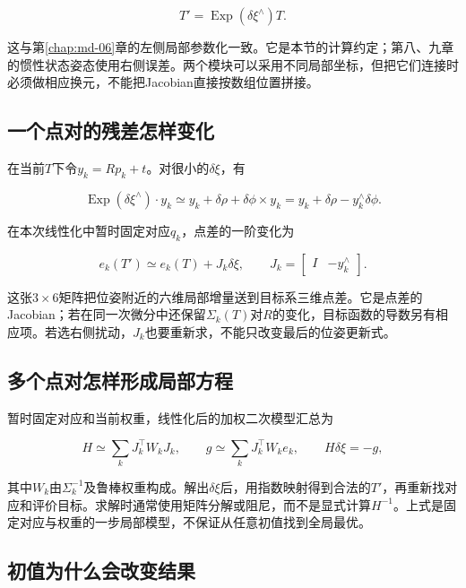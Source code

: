 \begin{equation*}
T'=\operatorname{Exp}(\delta\xi^\wedge)T.
\end{equation*}

这与第\ref{chap:md-06}章的左侧局部参数化一致。它是本节的计算约定；第八、九章的惯性状态姿态使用右侧误差。两个模块可以采用不同局部坐标，但把它们连接时必须做相应换元，不能把Jacobian直接按数组位置拼接。

\subsection{一个点对的残差怎样变化}

在当前$T$下令$y_k=Rp_k+t$。对很小的$\delta\xi$，有

\begin{equation*}
\operatorname{Exp}(\delta\xi^\wedge)\cdot y_k
\simeq y_k+\delta\rho+\delta\phi\times y_k
=y_k+\delta\rho-y_k^\wedge\delta\phi.
\end{equation*}

在本次线性化中暂时固定对应$q_k$，点差的一阶变化为

\begin{equation*}
e_k(T')\simeq e_k(T)+J_k\delta\xi,\qquad
J_k=\begin{bmatrix}I&-y_k^\wedge\end{bmatrix}.
\end{equation*}

这张$3\times6$矩阵把位姿附近的六维局部增量送到目标系三维点差。它是点差的Jacobian；若在同一次微分中还保留$\Sigma_k(T)$对$R$的变化，目标函数的导数另有相应项。若选右侧扰动，$J_k$也要重新求，不能只改变最后的位姿更新式。

\subsection{多个点对怎样形成局部方程}

暂时固定对应和当前权重，线性化后的加权二次模型汇总为

\begin{equation*}
H\simeq\sum_kJ_k^\top W_kJ_k,\qquad
g\simeq\sum_kJ_k^\top W_ke_k,\qquad
H\delta\xi=-g,
\end{equation*}

其中$W_k$由$\Sigma_k^{-1}$及鲁棒权重构成。解出$\delta\xi$后，用指数映射得到合法的$T'$，再重新找对应和评价目标。求解时通常使用矩阵分解或阻尼，而不是显式计算$H^{-1}$。上式是固定对应与权重的一步局部模型，不保证从任意初值找到全局最优。

\subsection{初值为什么会改变结果}

